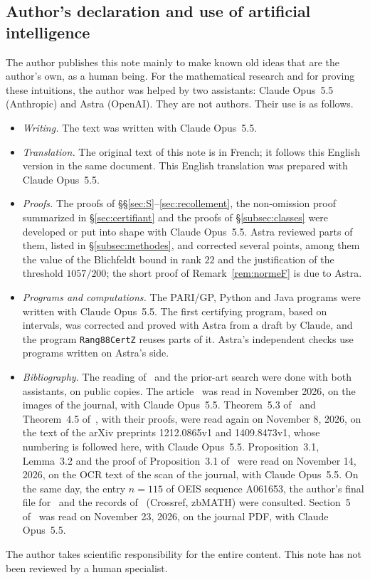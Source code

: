 \documentclass[11pt,a4paper]{amsart}
\theoremstyle{plain}
\theoremstyle{definition}
\numberwithin{equation}{section}
\begin{document}
\subsection*{Author's declaration and use of artificial intelligence}
The author publishes this note mainly to make known old ideas that are the author's own, as a human being. For the mathematical research and for proving these intuitions, the author was helped by two assistants: Claude Opus~5.5 (Anthropic) and Astra (OpenAI). They are not authors. Their use is as follows.
\begin{itemize}
\item \emph{Writing.} The text was written with Claude Opus~5.5.
\item \emph{Translation.} The original text of this note is in French; it follows this English version in the same document. This English translation was prepared with Claude Opus~5.5.
\item \emph{Proofs.} The proofs of \S\S\ref{sec:S}--\ref{sec:recollement}, the non-omission proof summarized in \S\ref{sec:certifiant} and the proofs of \S\ref{subsec:classes} were developed or put into shape with Claude Opus~5.5. Astra reviewed parts of them, listed in \S\ref{subsec:methodes}, and corrected several points, among them the value of the Blichfeldt bound in rank $22$ and the justification of the threshold $1057/200$; the short proof of Remark~\ref{rem:normeF} is due to Astra.
\item \emph{Programs and computations.} The PARI/GP, Python and Java programs were written with Claude Opus~5.5. The first certifying program, based on intervals, was corrected and proved with Astra from a draft by Claude, and the program \texttt{Rang88CertZ} reuses parts of it. Astra's independent checks use programs written on Astra's side.
\item \emph{Bibliography.} The reading of~\cite{Sak26} and the prior-art search were done with both assistants, on public copies. The article~\cite{Que81} was read in November 2026, on the images of the journal, with Claude Opus~5.5. Theorem~5.3 of~\cite{Neb13} and Theorem~4.5 of~\cite{Neb16}, with their proofs, were read again on November 8, 2026, on the text of the arXiv preprints 1212.0865v1 and 1409.8473v1, whose numbering is followed here, with Claude Opus~5.5. Proposition~3.1, Lemma~3.2 and the proof of Proposition~3.1 of~\cite{Bay84} were read on November 14, 2026, on the OCR text of the scan of the journal, with Claude Opus~5.5. On the same day, the entry $n=115$ of OEIS sequence A061653, the author's final file for~\cite{Neb13} and the records of~\cite{Que92} (Crossref, zbMATH) were consulted. Section~5 of~\cite{BFS05} was read on November 23, 2026, on the journal PDF, with Claude Opus~5.5.
\end{itemize}
The author takes scientific responsibility for the entire content. This note has not been reviewed by a human specialist.
\end{document}
